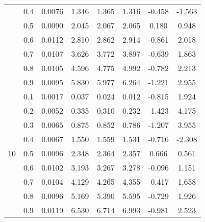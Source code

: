\documentclass[11pt,a4paper]{report}
\begin{document}
\begin{longtable}{ | c | c || c | c | c | c | c | c | }
 & 0.4 & 0.0076 & 1.346 & 1.365 & 1.316 & -0.458 & -1.563 \\
 & 0.5 & 0.0090 & 2.045 & 2.067 & 2.065 & 0.180 & 0.948 \\
 & 0.6 & 0.0112 & 2.810 & 2.862 & 2.914 & -0.861 & 2.018 \\
 & 0.7 & 0.0107 & 3.626 & 3.772 & 3.897 & -0.639 & 1.863 \\
 & 0.8 & 0.0105 & 4.596 & 4.775 & 4.992 & -0.782 & 2.213 \\
 & 0.9 & 0.0095 & 5.830 & 5.977 & 6.264 & -1.221 & 2.955 \\
 \hline
\multirow{9}{*}{10} & 0.1 & 0.0017 & 0.037 & 0.024 & 0.012 & -0.815 & 1.924 \\
 & 0.2 & 0.0052 & 0.335 & 0.310 & 0.232 & -1.423 & 4.175 \\
 & 0.3 & 0.0065 & 0.875 & 0.852 & 0.786 & -1.207 & 3.955 \\
 & 0.4 & 0.0067 & 1.550 & 1.559 & 1.531 & -0.716 & -2.308 \\
 & 0.5 & 0.0096 & 2.348 & 2.364 & 2.357 & 0.666 & 0.561 \\
 & 0.6 & 0.0102 & 3.193 & 3.267 & 3.278 & -0.096 & 1.151 \\
 & 0.7 & 0.0104 & 4.129 & 4.265 & 4.355 & -0.417 & 1.658 \\
 & 0.8 & 0.0096 & 5.169 & 5.390 & 5.595 & -0.729 & 1.926 \\
 & 0.9 & 0.0119 & 6.530 & 6.714 & 6.993 & -0.981 & 2.523 \\
 \hline
\hline
\end{longtable}
\end{document}
